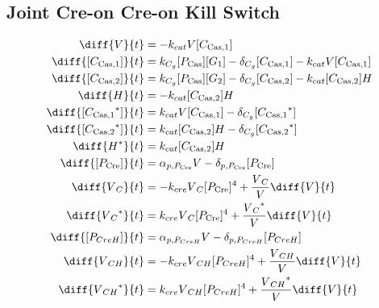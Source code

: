 \subsection{Joint Cre-on Cre-on Kill Switch}
\label{s:Joint_Cre_on_Cre_on_Kill_Switch}

\begin{align}
\diff{\vectorGen{}}{t} & = - \casCutRate{{}}\vectorGen{}\conc{\cplx{\cas}{1}}\\
\diff{\conc{\cplx{\cas}{1}}}{t} & =  \gRnaBind{}\conc{\proSp{\cas{}}}\conc{\gRna{1}} - \casCompDegradeRate{}\conc{\cplx{\cas}{1}} - \casCutRate{{}}\vectorGen{}\conc{\cplx{\cas}{1}}\\
\diff{\conc{\cplx{\cas}{2}}}{t} & =  \gRnaBind{}\conc{\proSp{\cas{}}}\conc{\gRna{2}} - \casCompDegradeRate{}\conc{\cplx{\cas}{2}} - \casCutRate{{}}\conc{\cplx{\cas}{2}}\hostGen{}\\
\diff{\hostGen{}}{t} & = - \casCutRate{{}}\conc{\cplx{\cas}{2}}\hostGen{}\\
\diff{\conc{\bound{\cplx{\cas}{1}}}}{t} & =  \casCutRate{{}}\vectorGen{}\conc{\cplx{\cas}{1}} - \casCompDegradeRate{}\conc{\bound{\cplx{\cas}{1}}}\\
\diff{\conc{\bound{\cplx{\cas}{2}}}}{t} & =  \casCutRate{{}}\conc{\cplx{\cas}{2}}\hostGen{} - \casCompDegradeRate{}\conc{\bound{\cplx{\cas}{2}}}\\
\diff{\edited{\hostGen{}}}{t} & =  \casCutRate{{}}\conc{\cplx{\cas}{2}}\hostGen{}\\
\diff{\conc{\proSp{\cre{}}}}{t} & =  \txtlRate{\proSp{\cre{}}}\vectorGen{} - \proDegradeRate{\proSp{\cre{}}}\conc{\proSp{\cre{}}}\\
\diff{\vectorGen{}_C}{t} & = - \creCutRate{} \vectorGen{}_C \conc{\proSp{\cre{}}}^4 + \frac{\vectorGen{}_C}{\vectorGen{}} \diff{\vectorGen{}}{t}\\
\diff{\edited{\vectorGen{}_C}}{t} & =  \creCutRate{} \vectorGen{}_C \conc{\proSp{\cre{}}}^4 + \frac{\edited{\vectorGen{}_C}}{\vectorGen{}} \diff{\vectorGen{}}{t}\\
\diff{\conc{\proSp{CreH}}}{t} & =  \txtlRate{\proSp{CreH}}\vectorGen{} - \proDegradeRate{\proSp{CreH}}\conc{\proSp{CreH}}\\
\diff{\vectorGen{}_{CH}}{t} & = - \creCutRate{} \vectorGen{}_{CH} \conc{\proSp{CreH}}^4 + \frac{\vectorGen{}_{CH}}{\vectorGen{}} \diff{\vectorGen{}}{t}\\
\diff{\edited{\vectorGen{}_{CH}}}{t} & =  \creCutRate{} \vectorGen{}_{CH} \conc{\proSp{CreH}}^4 + \frac{\edited{\vectorGen{}_{CH}}}{\vectorGen{}} \diff{\vectorGen{}}{t}\\

\end{align}

